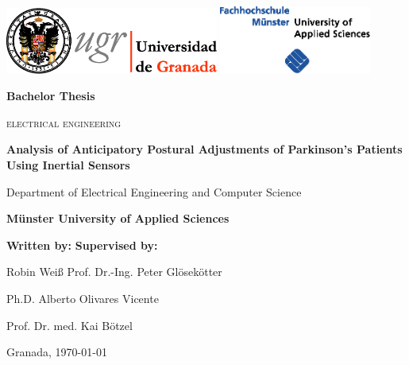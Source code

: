 \begin{titlepage}
\label{ch:titlepage}
\begin{center}

\includegraphics[width=7cm]{images/universidad_de_granada.eps}
	\hfill
\includegraphics[width=5cm]{images/fh-muenster.eps}
	\hspace{1.0cm}
	\\ 

\vspace{3cm}

\Large\textbf{Bachelor Thesis}

\large\textsc{electrical engineering}

\vspace{1cm}

{\huge\textbf{Analysis of Anticipatory Postural Adjustments of Parkinson's Patients Using Inertial Sensors}}

\vspace{1cm}

Department of Electrical Engineering and Computer Science

\textbf{Münster University of Applied Sciences}

\end{center}

\vspace{1.5cm}

\textbf{Written by:}  \hfill \textbf{Supervised by:}

Robin Weiß \hfill Prof. Dr.-Ing. Peter Gl\"{o}sek\"{o}tter 

\hfill Ph.D. Alberto Olivares Vicente

\hfill Prof. Dr. med. Kai B\"{o}tzel

\vfill

Granada, \today

\end{titlepage}
